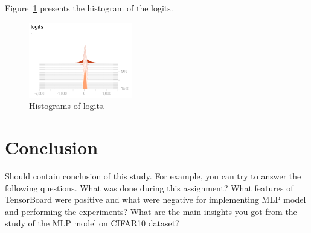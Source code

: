 \documentclass{article}
\begin{document}
Figure~\ref{fig:histogramlogits} presents the histogram of the logits.

\begin{figure}
\centering
\includegraphics[width=0.4\textwidth]{logits.png}
\caption{Histograms of logits.}
\label{fig:histogramlogits}
\end{figure}


\section{Conclusion}
Should contain conclusion of this study.
For example, you can try to answer the following questions.
What was done during this assignment? What features of TensorBoard were positive and what were negative for implementing MLP model and performing the experiments?
What are the main insights you got from the study of the MLP model on CIFAR10 dataset?
\end{document}
